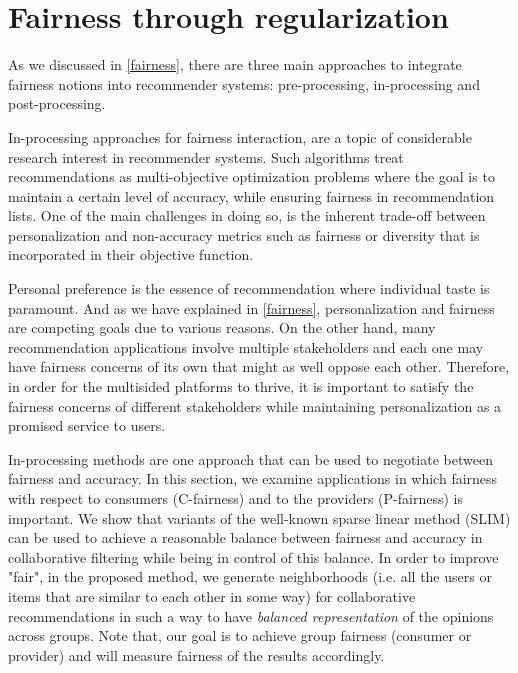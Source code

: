 \chapter{Fairness through regularization}
\label{ch:fairness_inproc}



As we discussed in \ref{fairness}, there are three main approaches to integrate fairness notions into recommender systems: pre-processing, in-processing and post-processing.

In-processing approaches for fairness interaction, are a topic of considerable research interest in recommender systems. Such algorithms treat recommendations as multi-objective optimization problems where the goal is to maintain a certain level of accuracy, while ensuring fairness in recommendation lists. One of the main challenges in doing so, is the inherent trade-off between personalization and non-accuracy metrics such as fairness or diversity that is incorporated in their objective function.

Personal preference is the essence of recommendation where individual taste is paramount. And as we have explained in \ref{fairness}, personalization and fairness are competing goals due to various reasons. On the other hand, many recommendation applications involve multiple stakeholders and each one may have fairness concerns of its own that might as well oppose each other. Therefore, in order for the multisided platforms to thrive, it is important to satisfy the fairness concerns of different stakeholders while maintaining personalization as a promised service to users.

In-processing methods are one approach that can be used to negotiate between fairness and accuracy. In this section, we examine applications in which fairness with respect to consumers (C-fairness) and to the providers (P-fairness) is important. We show that variants of the well-known sparse linear method (SLIM) can be used to achieve a reasonable balance between fairness and accuracy in collaborative filtering while being in control of this balance. In order to improve "fair", in the proposed method, we generate neighborhoods (i.e. all the users or items that are similar to each other in some way) for collaborative recommendations in such a way to have \textit{balanced representation} of the opinions across groups. Note that, our goal is to achieve group fairness (consumer or provider) and will measure fairness of the results accordingly.

